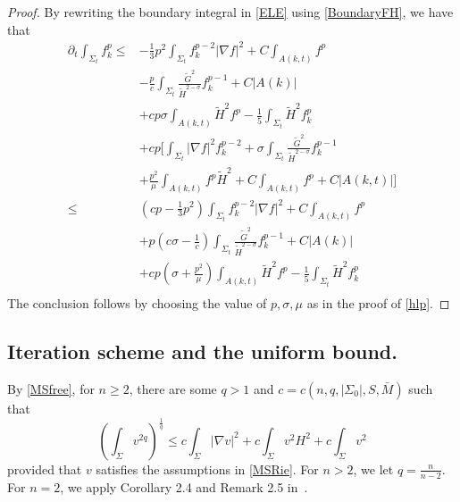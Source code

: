 \begin{proof}
    By rewriting the boundary integral in \autoref{ELE} using \autoref{BoundaryFH}, we have that
    \begin{equation*}
        \begin{split}
            \partial_t \int_{\Sigma_t} f_k^p
        \leq &  -\frac{1}{3}p^2 \int_{\Sigma_t} f_{k}^{p-2}\left| \nabla f \right| ^2+C \int_{A(k,t)} f^p  \\
        &-\frac{p}{c} \int_{\Sigma_t} \frac{\tilde{G}^2}{\tilde{H}^{2-\sigma }}f_{k}^{p-1}+C \left| A(k) \right|\\
        &+cp \sigma \int_{A(k,t)}^{}\tilde{H}^2f^p-\frac{1}{5}\int_{\Sigma_t} \tilde{H}^2f_{k}^{p} \\
        &+cp \bigg[  \int_{\Sigma_t} \left| \nabla f \right| ^2 f_{k}^{p-2} + \sigma \int_{\Sigma_t} \frac{\tilde{G}^{2} }{\tilde{H}^{2-\sigma } } f_{k}^{p-1} \\
        &+ \frac{p^2}{\mu }\int_{A(k,t)}^{}f^p \tilde{H}^{2} + C \int_{A(k,t)}^{}f^p + C \left| A(k,t) \right|\bigg]\\
        \leq & \left( cp-\frac{1}{3}p^2 \right) \int_{\Sigma_t} f_{k}^{p-2}\left| \nabla f \right| ^2+C \int_{A(k,t)} f^p  \\
        &+ p\left( c\sigma - \frac{1}{c} \right) \int_{\Sigma_t} \frac{\tilde{G}^2}{\tilde{H}^{2-\sigma }}f_{k}^{p-1}+C \left| A(k) \right|\\
        &+ cp\left(  \sigma + \frac{p^2}{\mu } \right) \int_{A(k,t)}^{}\tilde{H}^2f^p-\frac{1}{5}\int_{\Sigma_t} \tilde{H}^2f_{k}^{p}\\
        \end{split}
        \end{equation*}
        The conclusion follows by choosing the value of $p,\sigma ,\mu $ as in the proof of \autoref{hlp}. 
\end{proof}


\subsection{Iteration scheme and the uniform bound.}

By \autoref{MSfree}, for $n \geq 2$, there are some $q>1$ and $c=c(n,q,\left| \Sigma_0 \right|,S,\bar{M} )$ such that
\[\left( \int_{\Sigma} v^{2q} \right) ^{\frac{1}{q}} \leq c \int_{\Sigma} \left| \nabla v \right| ^2 + c \int_{\Sigma} v^2 H^2 + c \int_{\Sigma} v^2\]
provided that $v$ satisfies the assumptions in \autoref{MSRie}.
For $n>2$, we let $q=\frac{n}{n-2}$. For $n=2$, we apply Corollary 2.4 and Remark 2.5 in~\cite{edelen_convexity_2016}.

